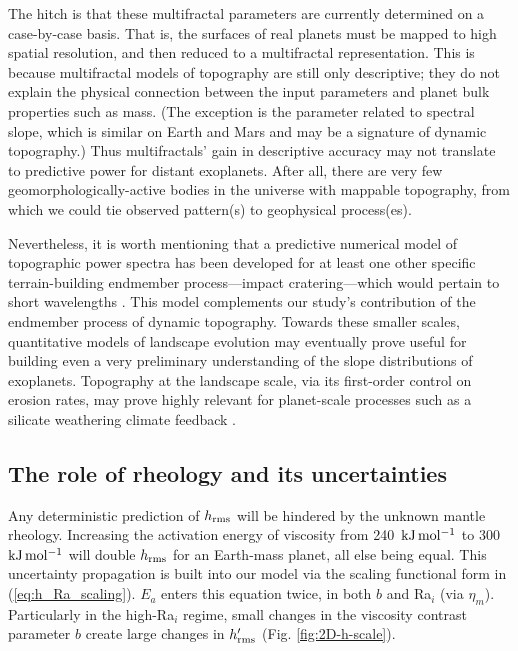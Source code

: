 The hitch is that these multifractal parameters are currently determined on a case-by-case basis. That is, the surfaces of real planets must be mapped to high spatial resolution, and then reduced to a multifractal representation. This is because multifractal models of topography \citep[e.g.,][]{landais_topography_2019} are still only descriptive; they do not explain the physical connection between the input parameters and planet bulk properties such as mass. (The exception is the parameter related to spectral slope, which is similar on Earth and Mars and may be a signature of dynamic topography.) Thus multifractals' gain in descriptive accuracy may not translate to predictive power for distant exoplanets. After all, there are very few geomorphologically-active bodies in the universe with mappable topography, from which we could tie observed pattern(s) to geophysical process(es).


Nevertheless, it is worth mentioning that a predictive numerical model of topographic power spectra has been developed for at least one other specific terrain-building endmember process---impact cratering---which would pertain to short wavelengths \citep{rosenburg_topographic_2015}. This model complements our study's contribution of the endmember process of dynamic topography. Towards these smaller scales, quantitative models of landscape evolution \citep[e.g.,][]{perron_controls_2008, lipp_scaledependent_2021} may eventually prove useful for building even a very preliminary understanding of the slope distributions of exoplanets. Topography at the landscape scale, via its first-order control on erosion rates, may prove highly relevant for planet-scale processes such as a silicate weathering climate feedback \citep{graham_thermodynamic_2020}.






\subsection{The role of rheology and its uncertainties} \label{sec:discussion-rheology}


Any deterministic prediction of $h_{\rm rms}$ will be hindered by the unknown mantle rheology. Increasing the activation energy of viscosity from 240~$\rm{kJ\,mol^{-1}}$ to 300~$\rm{kJ\,mol^{-1}}$ will double $h_{\rm rms}$ for an Earth-mass planet, all else being equal. This uncertainty propagation is built into our model via the scaling functional form in (\ref{eq:h_Ra_scaling}). $E_a$ enters this equation twice, in both $b$ and Ra$_i$ (via $\eta_m$). Particularly in the high-Ra$_i$ regime, small changes in the viscosity contrast parameter $b$ create large changes in $h_{\rm rms}^\prime$ (Fig. \ref{fig:2D-h-scale}). 

